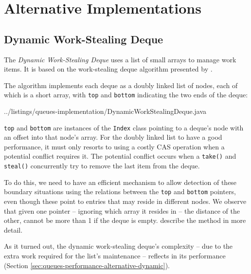 


\section{Alternative Implementations}
\label{sec:queues-alternative-implementations}

\subsection{Dynamic Work-Stealing Deque}
\label{sec:queues-alternative-implementations-dynamic-deque}

The \emph{Dynamic Work-Stealing Deque} uses a list of small arrays to
manage work items. It is based on the work-stealing deque algorithm
presented by \textcite{Hendler2005}.

The algorithm implements each deque as a doubly linked list of nodes,
each of which is a short array, with \lstinline!top! and
\lstinline!bottom! indicating the two ends of the deque:


{
    ../listings/queues-implementation/DynamicWorkStealingDeque.java
}

\lstinline!top! and \lstinline!bottom! are instances of the
\lstinline!Index! class pointing to a deque's node with an offset into
that node's array. For the doubly linked list to have a good
performance, it must only resorts to using a costly CAS operation when
a potential conflict requires it. The potential conflict occurs when a
\lstinline!take()!  and \lstinline!steal()!  concurrently try to
remove the last item from the deque.

To do this, we need to have an efficient mechanism to allow detection
of these boundary situations using the relations between the
\lstinline!top! and \lstinline!bottom! pointers, even though these
point to entries that may reside in different nodes. We observe that
given one pointer -- ignoring which array it resides in -- the
distance of the other, cannot be more than 1 if the deque is
empty. \textcite{Hendler2005} describe the method in more detail.

As it turned out, the dynamic work-stealing deque's complexity -- due
to the extra work required for the list's maintenance -- reflects in
its performance (Section
\ref{sec:queues-performance-alternative-dynamic}).

